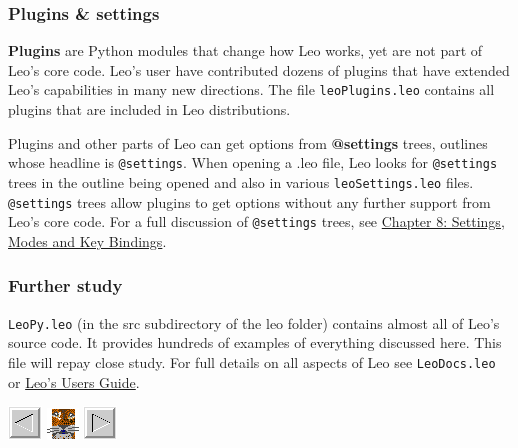 \documentclass[10pt,a4paper,english]{article}
\begin{document}
\hypertarget{plugins-settings}{}
\subsubsection*{Plugins {\&} settings}

\textbf{Plugins} are Python modules that change how Leo works, yet are not part of Leo's core code.
Leo's user have contributed dozens of plugins that have extended Leo's capabilities in many new directions.
The file \texttt{leoPlugins.leo} contains all plugins that are included in Leo distributions.

Plugins and other parts of Leo can get options from \textbf{@settings} trees,
outlines whose headline is \texttt{@settings}. When opening a .leo file, Leo looks
for \texttt{@settings} trees in the outline being opened and also in various
\texttt{leoSettings.leo} files. \texttt{@settings} trees allow plugins to get options without
any further support from Leo's core code. For a full discussion of
\texttt{@settings} trees, see \href{customizing.html}{Chapter 8: Settings, Modes and Key Bindings}.



\hypertarget{further-study}{}
\subsubsection*{Further study}

\texttt{LeoPy.leo} (in the src subdirectory of the leo folder) contains almost all of Leo's source code.
It provides hundreds of examples of everything discussed here.
This file will repay close study.
For full details on all aspects of Leo see \texttt{LeoDocs.leo} or \href{leo_TOC.html}{Leo's Users Guide}.


\hspace*{\fill}\hrulefill\hspace*{\fill}


\href{\#back}{\includegraphics{arrow_lt.gif}} \href{\#home}{\includegraphics{leo.gif}} \href{\#next}{\includegraphics{arrow_rt.gif}}
\end{document}
